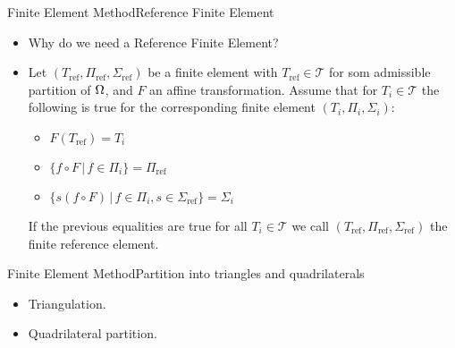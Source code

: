 \begin{frame}{Finite Element Method}{Reference Finite Element}
    \begin{itemize}
        \item Why do we need a Reference Finite Element?
        \item \begin{defn}
            Let $(T_{\text{ref}}, \Pi_{\text{ref}},\Sigma_{\text{ref}})$ be a finite element 
        with $T_{\text{ref}}\in \mathcal{T}$ for som admissible partition of 
        $\Omega$, and 
        $F$ an affine transformation. 
        Assume that for $T_i\in\mathcal{T}$ the following 
        is true for the corresponding finite element $(T_i, \Pi_i,\Sigma_i)$:
        \begin{itemize}
            \item $F(T_{\text{ref}}) = T_i$
            \item $\{ f\circ F \,|\,  f \in \Pi_i \} =\Pi_{\text{ref}}  $
            \item $\{ s(f\circ F) \,|\, f \in \Pi_i, s \in \Sigma_{\text{ref}} \} = \Sigma_i$
        \end{itemize}
        If the previous equalities are true for all $T_i\in \mathcal{T}$ we call 
        $(T_{\text{ref}}, \Pi_{\text{ref}},\Sigma_{\text{ref}})$ the finite reference 
        element.
        \end{defn}
    \end{itemize}
\end{frame}

\begin{frame}{Finite Element Method}{Partition into triangles and quadrilaterals}
    \begin{itemize}
        \item Triangulation.
        \item Quadrilateral partition.
    \end{itemize}
    
\end{frame}
